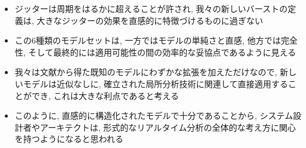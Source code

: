 \begin{frame}{}
    \begin{itemize}
        \item ジッターは周期をはるかに超えることが許され, 我々の新しいバーストの定義は, 大きなジッターの効果を直感的に特徴づけるものに過ぎない
        \item この6種類のモデルセットは, 一方ではモデルの単純さと直感, 他方では完全性, そして最終的には適用可能性の間の効率的な妥協点であるように見える
        \item 我々は文献から得た既知のモデルにわずかな拡張を加えただけなので, 新しいモデルは近似なしに, 確立された局所分析技術に関連して直接適用することができ, これは大きな利点であると考える
        \item このように, 直感的に構造化されたモデルで十分であることから, システム設計者やアーキテクトは, 形式的なリアルタイム分析の全体的な考え方に関心を持つようになると思われる
    \end{itemize}
\end{frame}
